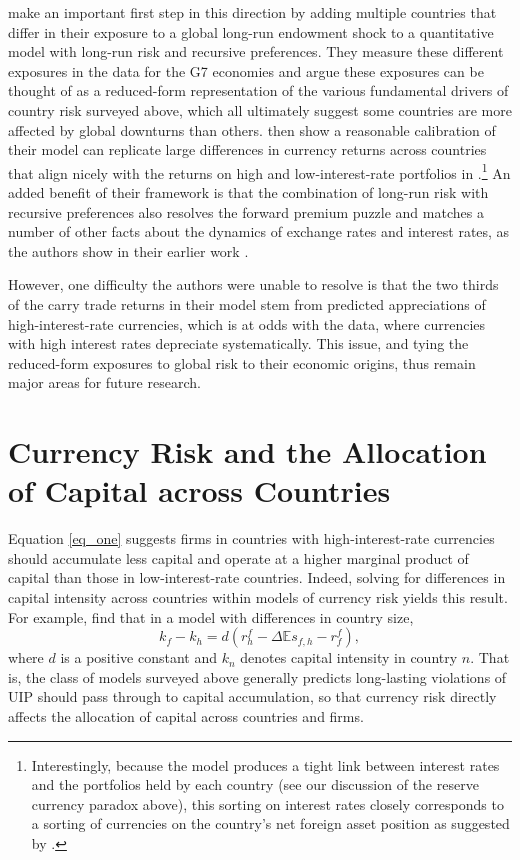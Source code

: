 \documentclass[11pt]{article}
\begin{document}
\citet{ColacitoCroceGavazzoniReady2018} make an important first step in this direction by adding multiple countries that differ in their exposure to a global long-run endowment shock to a quantitative model with long-run risk and recursive preferences. They measure these different exposures in the data for the G7 economies and argue these exposures can be thought of as a reduced-form representation of the various fundamental drivers of country risk surveyed above, which all ultimately suggest some countries are more affected by global downturns than others. \citet{ColacitoCroceGavazzoniReady2018} then show a reasonable calibration of their model can replicate large differences in currency returns across countries that align nicely with the returns on high and low-interest-rate portfolios in \cite{LustigRoussanovVerdelhan2011}.\footnote{ Interestingly, because the model produces a tight link between interest rates and the portfolios held by each country (see our discussion of the reserve currency paradox above), this sorting on interest rates closely corresponds to a sorting of currencies on the country's net foreign asset position as suggested by \citet{DellaCorteetal2016}.} 
An added benefit of their framework is that the combination of long-run risk with recursive preferences also resolves the forward premium puzzle and matches a number of other facts about the dynamics of exchange rates and interest rates, as the authors show in their earlier work \citep{ColacitoCroce2011}. 

However, one difficulty the authors were unable to resolve is that the two thirds of the carry trade returns in their model stem from predicted appreciations of high-interest-rate currencies, which is at odds with the data, where currencies with high interest rates depreciate systematically. This issue, and tying the reduced-form exposures to global risk to their economic origins, thus remain major areas for future research.


\section{Currency Risk and the Allocation of Capital across Countries\label{sec_capital}}

Equation \ref{eq_one} suggests firms in countries with high-interest-rate currencies should accumulate less capital and operate at a higher marginal product of capital than those in low-interest-rate countries. Indeed, solving for differences in capital intensity across countries within models of currency risk yields this result. For example, \citet{HassanMertensZhang2015} find that in a model with differences in country size,  
\begin{equation}
    k_f - k_h = d
    \left(r^f_h - \Delta \mathbb{E} s_{f, h} - r^f_f \right),
\end{equation}
where $d$ is a positive constant and $k_n$ denotes capital intensity in country $n$. That is, the class of models surveyed above generally predicts long-lasting violations of UIP should pass through to capital accumulation, so that currency risk directly affects the allocation of capital across countries and firms.
\end{document}
